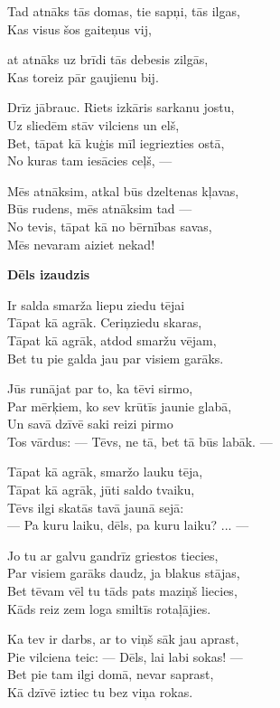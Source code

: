 \documentclass[11pt]{article}
\begin{document}
Tad atnāks tās domas, tie sapņi, tās ilgas,\\
Kas visus šos gaiteņus vij,\\
{at atnāks uz brīdi tās debesis zilgās,\\
Kas toreiz pār gaujienu bij.

Drīz jābrauc. Riets izkāris sarkanu jostu,\\
Uz sliedēm stāv vilciens un elš,\\
Bet, tāpat kā kuģis mīl iegriezties ostā,\\
No kuras tam iesācies ceļš, ---

Mēs atnāksim, atkal būs dzeltenas kļavas,\\
Būs rudens, mēs atnāksim tad ---\\
No tevis, tāpat kā no bērnības savas,\\
Mēs nevaram aiziet nekad!

\newpage

{\bf Dēls izaudzis}

Ir salda smarža liepu ziedu tējai\\
Tāpat kā agrāk. Ceriņziedu skaras,\\
Tāpat kā agrāk, atdod smaržu vējam,\\
Bet tu pie galda jau par visiem garāks.

Jūs runājat par to, ka tēvi sirmo,\\
Par mērķiem, ko sev krūtīs jaunie glabā,\\
Un savā dzīvē saki reizi pirmo\\
Tos vārdus: --- Tēvs, ne tā, bet tā būs labāk. ---

Tāpat kā agrāk, smaržo lauku tēja,\\
Tāpat kā agrāk, jūti saldo tvaiku,\\
Tēvs ilgi skatās tavā jaunā sejā:\\
--- Pa kuru laiku, dēls, pa kuru laiku? ... ---

Jo tu ar galvu gandrīz griestos tiecies,\\
Par visiem garāks daudz, ja blakus stājas,\\
Bet tēvam vēl tu tāds pats maziņš liecies,\\
Kāds reiz zem loga smiltīs rotaļājies.

Ka tev ir darbs, ar to viņš sāk jau aprast,\\
Pie vilciena teic: --- Dēls, lai labi sokas! ---\\
Bet pie tam ilgi domā, nevar saprast,\\
Kā dzīvē iztiec tu bez viņa rokas.

}
\end{document}
